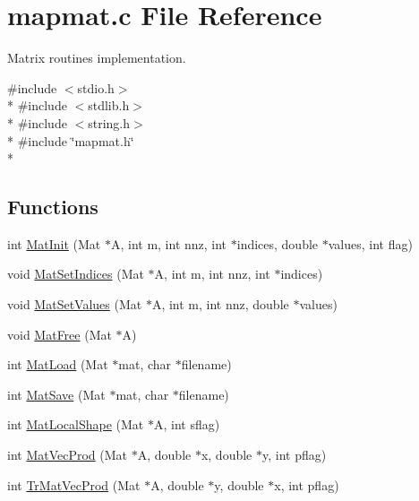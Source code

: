 \section{mapmat.\-c File Reference}
\label{mapmat_8c}


Matrix routines implementation.  


{\ttfamily \#include $<$stdio.\-h$>$}\\*
{\ttfamily \#include $<$stdlib.\-h$>$}\\*
{\ttfamily \#include $<$string.\-h$>$}\\*
{\ttfamily \#include \char`\"{}mapmat.\-h\char`\"{}}\\*
\subsection*{Functions}
\begin{DoxyCompactItemize}
\item 
int \hyperlink{mapmat_8c_aaffd7a76c3cf2834df302d1f844aea3e}{Mat\-Init} (Mat $\ast$A, int m, int nnz, int $\ast$indices, double $\ast$values, int flag)
\item 
void \hyperlink{mapmat_8c_aaf26c7678367e6757392c03abd22a105}{Mat\-Set\-Indices} (Mat $\ast$A, int m, int nnz, int $\ast$indices)
\item 
void \hyperlink{mapmat_8c_ad3d5adb742e7a82454fcd6eede21da91}{Mat\-Set\-Values} (Mat $\ast$A, int m, int nnz, double $\ast$values)
\item 
void \hyperlink{mapmat_8c_a4e1732c63feba9e589b5037d0a25ab75}{Mat\-Free} (Mat $\ast$A)
\item 
int \hyperlink{mapmat_8c_a56b5e9bda4e4ad0a2c4f2f12e94d077e}{Mat\-Load} (Mat $\ast$mat, char $\ast$filename)
\item 
int \hyperlink{mapmat_8c_a792b187cf2f23e526ecd5e2c3cbb9dab}{Mat\-Save} (Mat $\ast$mat, char $\ast$filename)
\item 
int \hyperlink{mapmat_8c_ae31f7ccb10cda5c97e49f640feed1ad4}{Mat\-Local\-Shape} (Mat $\ast$A, int sflag)
\item 
int \hyperlink{mapmat_8c_af757d9249d31d2839b3376ac2e3f5574}{Mat\-Vec\-Prod} (Mat $\ast$A, double $\ast$x, double $\ast$y, int pflag)
\item 
int \hyperlink{mapmat_8c_a1a51d7e8153d33045482100bbd07d0a9}{Tr\-Mat\-Vec\-Prod} (Mat $\ast$A, double $\ast$y, double $\ast$x, int pflag)
\end{DoxyCompactItemize}


